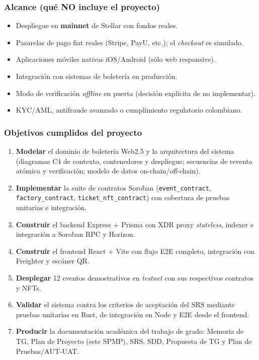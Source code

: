 \documentclass[12pt,oneside]{report}
\begin{document}
      \subsubsection*{Alcance (qué NO incluye el proyecto)}
      \begin{itemize}
        \item Despliegue en \textbf{mainnet} de Stellar con fondos reales.
        \item Pasarelas de pago fiat reales (Stripe, PayU, etc.); el \textit{checkout} es simulado.
        \item Aplicaciones móviles nativas iOS/Android (sólo web responsive).
        \item Integración con sistemas de boletería en producción.
        \item Modo de verificación \textit{offline} en puerta (decisión explícita de no implementar).
        \item KYC/AML, antifraude avanzado o cumplimiento regulatorio colombiano.
      \end{itemize}

      \subsubsection*{Objetivos cumplidos del proyecto}
      \begin{enumerate}
        \item \textbf{Modelar} el dominio de boletería Web2.5 y la arquitectura del sistema (diagramas C4 de contexto, contenedores y despliegue; secuencias de reventa atómica y verificación; modelo de datos on-chain/off-chain).
        \item \textbf{Implementar} la suite de contratos Soroban (\texttt{event\_contract}, \texttt{factory\_contract}, \texttt{ticket\_nft\_contract}) con cobertura de pruebas unitarias e integración.
        \item \textbf{Construir} el backend Express + Prisma con XDR proxy \textit{stateless}, indexer e integración a Soroban RPC y Horizon.
        \item \textbf{Construir} el frontend React + Vite con flujo E2E completo, integración con Freighter y escáner QR.
        \item \textbf{Desplegar} 12 eventos demostrativos en \textit{testnet} con sus respectivos contratos y NFTs.
        \item \textbf{Validar} el sistema contra los criterios de aceptación del SRS mediante pruebas unitarias en Rust, de integración en Node y E2E desde el frontend.
        \item \textbf{Producir} la documentación académica del trabajo de grado: Memoria de TG, Plan de Proyecto (este SPMP), SRS, SDD, Propuesta de TG y Plan de Pruebas/AUT-UAT.
      \end{enumerate}
\end{document}
